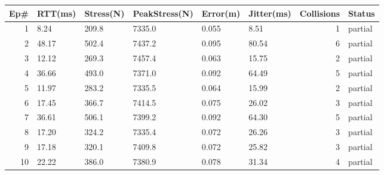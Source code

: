 \begin{tabular}{rlllllrl}
\toprule
Ep# & RTT(ms) & Stress(N) & PeakStress(N) & Error(m) & Jitter(ms) & Collisions & Status \\
\midrule
1 & 8.24 & 209.8 & 7335.0 & 0.055 & 8.51 & 1 & partial \\
2 & 48.17 & 502.4 & 7437.2 & 0.095 & 80.54 & 6 & partial \\
3 & 12.12 & 269.3 & 7457.4 & 0.063 & 15.75 & 2 & partial \\
4 & 36.66 & 493.0 & 7371.0 & 0.092 & 64.49 & 5 & partial \\
5 & 11.97 & 283.2 & 7335.5 & 0.064 & 15.99 & 2 & partial \\
6 & 17.45 & 366.7 & 7414.5 & 0.075 & 26.02 & 3 & partial \\
7 & 36.61 & 506.1 & 7399.2 & 0.092 & 64.30 & 5 & partial \\
8 & 17.20 & 324.2 & 7335.4 & 0.072 & 26.26 & 3 & partial \\
9 & 17.18 & 320.1 & 7409.8 & 0.072 & 25.82 & 3 & partial \\
10 & 22.22 & 386.0 & 7380.9 & 0.078 & 31.34 & 4 & partial \\
\bottomrule
\end{tabular}
